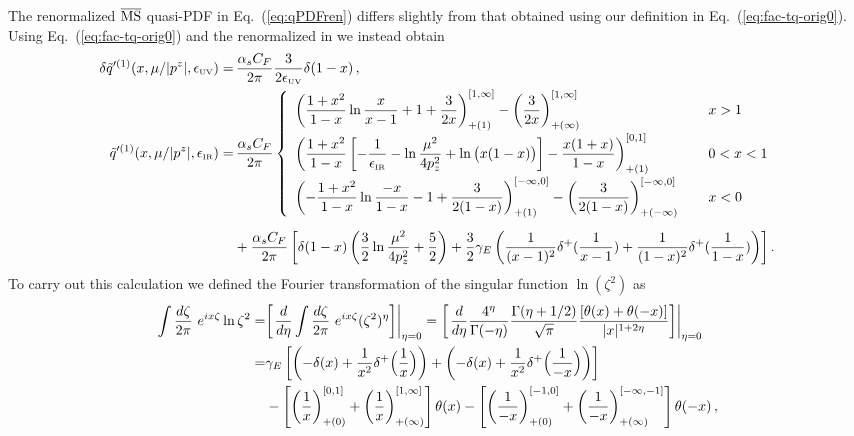 \begin{widetext}
The renormalized $\overline{\rm MS}$ quasi-PDF in Eq.~(\ref{eq:qPDFren}) differs slightly from that obtained using our definition in Eq.~(\ref{eq:fac-tq-orig0}). Using Eq.~(\ref{eq:fac-tq-orig0}) and the renormalized \spcorr in  we instead obtain
\begin{align}\label{eq:qPDFft}
\delta \tilde{q}'^{(1)}(x,\mu/|p^z|,\epsilon_{\mbox{\tiny UV}})
=&\,  {\alpha_sC_F\over 2\pi} {3\over 2\epsilon_{\mbox{\tiny UV}}}\delta(1-x)\,, \\
\tilde{q}'^{(1)}(x,\mu/|p^z|,\epsilon_{\mbox{\tiny IR}})
=&\, {\alpha_sC_F\over 2\pi}\left\{
\begin{array}{ll}
\displaystyle \left({1+x^2\over 1-x}\ln {x\over x-1} + 1 + {3\over 2x}\right)^{[1,\infty]}_{+(1)}- \left({3\over 2x}\right)^{[1,\infty]}_{+(\infty)} &\, x>1\\[10pt]
\displaystyle \left({1+x^2\over 1-x}\left[- {1\over \epsilon_{\mbox{\tiny IR}}} - \ln{\mu^2\over 4p_z^2} + \ln\big(x(1-x)\big)\right] - {x(1+x)\over 1-x}\right)^{[0,1]}_{+(1)}  &\, 0<x<1\\[10pt]
\displaystyle  \left(-{1+x^2\over 1-x}\ln {-x\over 1-x} - 1 + {3\over 2(1-x)}\right)^{[-\infty,0]}_{+(1)} - \left({3\over 2(1-x)}\right)^{[-\infty,0]}_{+(-\infty)} \quad &\, x<0
\end{array}\right.\nonumber\\[5pt]
& + {\alpha_sC_F\over 2\pi}\left[\delta(1-x)\left( {3\over2}\ln{\mu^2\over 4p_z^2} + {5\over2}\right) +{3\over2}\gamma_E\left({1\over(x-1)^2}\delta^+({1\over x-1}) + {1\over(1-x)^2}\delta^+({1\over 1-x})\right)\right]
 \nonumber .
\end{align}
To carry out this calculation we defined the Fourier transformation of the singular function $\ln(\zeta^2)$ as
\begin{align} \label{eq:subtlety}
\int {d\zeta\over 2\pi}\ e^{i x \zeta} \ln\zeta^2
= & \biggl[ \left.{d\over d\eta} \int {d\zeta\over 2\pi}\ e^{i x \zeta} (\zeta^2)^\eta \biggr] \right|_{\eta=0}
=\biggl[ \left.{d\over d\eta} {4^\eta\over \Gamma(-\eta)} {\Gamma(\eta+1/2)\over \sqrt{\pi}} {[\theta(x)+\theta(-x)]\over |x|^{1+2\eta}} \biggr]
\right|_{\eta=0}\\
=& \gamma_E \left[\left(-\delta(x) + {1\over x^2} \delta^+\Big({1\over x}\Big)\right) + \left(-\delta(x) + {1\over x^2} \delta^+\Big({1\over -x}\Big)\right)\right] \nn\\
& -\left[\left({1\over x}\right)_{+(0)}^{[0,1]} + \left({1\over x}\right)_{+(\infty)}^{[1,\infty]}\right]\theta(x) - \left[\left({1\over -x}\right)_{+(0)}^{[-1,0]} + \left({1\over -x}\right)_{+(\infty)}^{[-\infty,-1]}\right]\theta(-x)\,,\nn

\end{align}
\end{widetext}
